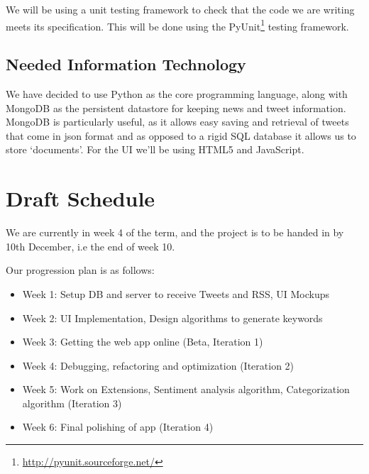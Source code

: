 \documentclass[a4paper,11pt]{article}
\begin{document}
			We will be using a unit testing framework to check that the code we are writing meets its specification. This will be done using the PyUnit\footnote{\url{http://pyunit.sourceforge.net/}} testing framework.
			
			
		\subsection{Needed Information Technology}
			We have decided to use Python as the core programming language, along with MongoDB as the persistent datastore for keeping news and tweet information. MongoDB is particularly useful, as it allows easy saving and retrieval of tweets that come in json format and as opposed to a rigid SQL database it allows us to store `documents'. For the UI we'll be using HTML5 and JavaScript.
			
	
	\section{Draft Schedule}
	
		We are currently in week 4 of the term, and the project is to be handed in by 10th December, i.e the end of week 10.
		
		Our progression plan is as follows:
		
		\begin{itemize}
			\item Week 1: Setup DB and server to receive Tweets and RSS, UI Mockups
			\item Week 2: UI Implementation, Design algorithms to generate keywords
			\item Week 3: Getting the web app online (Beta, Iteration 1)
			\item Week 4: Debugging, refactoring and optimization (Iteration 2)
			\item Week 5: Work on Extensions, Sentiment analysis algorithm, Categorization algorithm (Iteration 3)
			\item Week 6: Final polishing of app (Iteration 4)
		\end{itemize}
	
\end{document}
